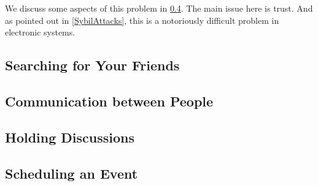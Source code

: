 We discuss some aspects of this problem in \cref{Scheduling}.
The main issue here is trust.
And as pointed out in \cref{SybilAttacks}, this is a notoriously difficult 
problem in electronic systems.

\subsection{Searching for Your Friends}
\label{UserSearch}



\subsection{Communication between People}
\label{Communicating}



\subsection{Holding Discussions}
\label{Discussions}



\subsection{Scheduling an Event}
\label{Scheduling}

